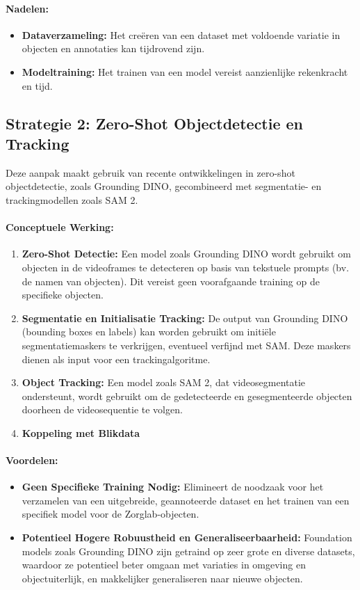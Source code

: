 \paragraph{Nadelen:}
\begin{itemize}
    \item \textbf{Dataverzameling:} Het creëren van een dataset met voldoende variatie in objecten en annotaties kan tijdrovend zijn.
    \item \textbf{Modeltraining:} Het trainen van een model vereist aanzienlijke rekenkracht en tijd.
\end{itemize}

\subsection{Strategie 2: Zero-Shot Objectdetectie en Tracking}

Deze aanpak maakt gebruik van recente ontwikkelingen in zero-shot objectdetectie, zoals Grounding DINO, gecombineerd met segmentatie- en trackingmodellen zoals SAM 2.

\paragraph{Conceptuele Werking:}
\begin{enumerate}
    \item \textbf{Zero-Shot Detectie:} Een model zoals Grounding DINO wordt gebruikt om objecten in de videoframes te detecteren op basis van tekstuele prompts (bv. de namen van objecten). Dit vereist geen voorafgaande training op de specifieke objecten.
    \item \textbf{Segmentatie en Initialisatie Tracking:} De output van Grounding DINO (bounding boxes en labels) kan worden gebruikt om initiële segmentatiemaskers te verkrijgen, eventueel verfijnd met SAM. Deze maskers dienen als input voor een trackingalgoritme.
    \item \textbf{Object Tracking:} Een model zoals SAM 2, dat videosegmentatie ondersteunt, wordt gebruikt om de gedetecteerde en gesegmenteerde objecten doorheen de videosequentie te volgen.
    \item \textbf{Koppeling met Blikdata}
\end{enumerate}

\paragraph{Voordelen:}
\begin{itemize}
    \item \textbf{Geen Specifieke Training Nodig:} Elimineert de noodzaak voor het verzamelen van een uitgebreide, geannoteerde dataset en het trainen van een specifiek model voor de Zorglab-objecten.
    \item \textbf{Potentieel Hogere Robuustheid en Generaliseerbaarheid:} Foundation models zoals Grounding DINO zijn getraind op zeer grote en diverse datasets, waardoor ze potentieel beter omgaan met variaties in omgeving en objectuiterlijk, en makkelijker generaliseren naar nieuwe objecten.
\end{itemize}

